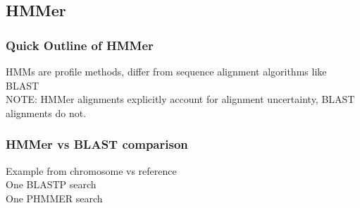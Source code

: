 \documentclass[table]{beamer}
\begin{document}
\subsection{HMMer}

    \begin{frame}
      \frametitle{Quick Outline of HMMer}   
      HMMs are profile methods, differ from sequence alignment algorithms like BLAST \\
      NOTE: HMMer alignments explicitly account for alignment uncertainty, BLAST alignments do not.
    \end{frame}

    \begin{frame}
      \frametitle{HMMer vs BLAST comparison}   
      Example from chromosome vs reference \\
      One BLASTP search \\
      One PHMMER search
    \end{frame}
\end{document}
